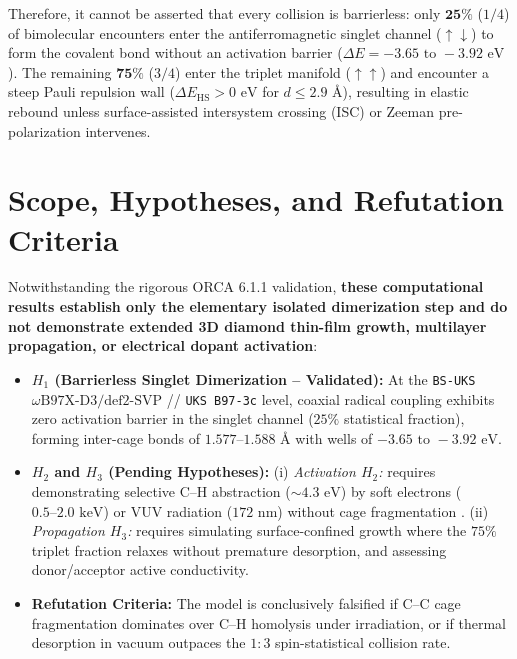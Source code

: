 \documentclass[10pt,twocolumn,a4paper]{article}
\begin{document}
Therefore, it cannot be asserted that every collision is barrierless: only $\mathbf{25\%}$ ($1/4$) of bimolecular encounters enter the antiferromagnetic singlet channel ($\uparrow\downarrow$) to form the covalent bond without an activation barrier ($\Delta E = -3.65\text{ to }-3.92\text{ eV}$). The remaining $\mathbf{75\%}$ ($3/4$) enter the triplet manifold ($\uparrow\uparrow$) and encounter a steep Pauli repulsion wall ($\Delta E_{\text{HS}} > 0\text{ eV}$ for $d \le 2.9\text{ \AA}$), resulting in elastic rebound unless surface-assisted intersystem crossing (ISC) or Zeeman pre-polarization intervenes.

\section{Scope, Hypotheses, and Refutation Criteria}
Notwithstanding the rigorous ORCA 6.1.1 validation, \textbf{these computational results establish only the elementary isolated dimerization step and do not demonstrate extended 3D diamond thin-film growth, multilayer propagation, or electrical dopant activation}:
\begin{itemize}\setlength{\itemsep}{1pt}\setlength{\parskip}{0pt}
    \item \textbf{$H_1$ (Barrierless Singlet Dimerization -- Validated):} At the \texttt{BS-UKS} $\omega\text{B97X-D3/def2-SVP}$ // \texttt{UKS B97-3c} level, coaxial radical coupling exhibits zero activation barrier in the singlet channel ($25\%$ statistical fraction), forming inter-cage bonds of $1.577\text{--}1.588\text{ \AA}$ with wells of $-3.65\text{ to }-3.92\text{ eV}$.
    \item \textbf{$H_2$ and $H_3$ (Pending Hypotheses):} (i) \textit{Activation $H_2$:} requires demonstrating selective $\text{C--H}$ abstraction ($\sim 4.3\text{ eV}$) by soft electrons ($0.5\text{--}2.0\text{ keV}$) or VUV radiation ($172\text{ nm}$) without cage fragmentation \cite{Fu2025}. (ii) \textit{Propagation $H_3$:} requires simulating surface-confined growth where the $75\%$ triplet fraction relaxes without premature desorption, and assessing donor/acceptor active conductivity.
    \item \textbf{Refutation Criteria:} The model is conclusively falsified if $\text{C--C}$ cage fragmentation dominates over $\text{C--H}$ homolysis under irradiation, or if thermal desorption in vacuum outpaces the $1:3$ spin-statistical collision rate.
\end{itemize}
\end{document}
